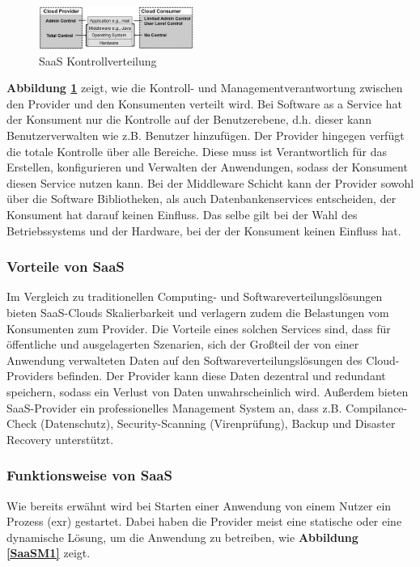 \begin{figure}[H]
    \centering
	\includegraphics[width=0.45\textwidth]{Images/SaaSControl}
	\caption{SaaS Kontrollverteilung \cite{Badger}}
	\label{SaaSControl}
\end{figure}

\textbf{Abbildung \ref{SaaSControl}} zeigt, wie die Kontroll- und Managementverantwortung zwischen den Provider und den Konsumenten verteilt wird.
Bei Software as a Service hat der Konsument nur die Kontrolle auf der Benutzerebene, d.h. dieser kann Benutzerverwalten wie z.B. Benutzer hinzufügen.
Der Provider hingegen verfügt die totale Kontrolle über alle Bereiche. Diese muss ist Verantwortlich für das Erstellen, konfigurieren und Verwalten der Anwendungen, 
sodass der Konsument diesen Service nutzen kann.
Bei der Middleware Schicht kann der Provider sowohl über die Software Bibliotheken, als auch Datenbankenservices entscheiden, der Konsument hat darauf keinen Einfluss.
Das selbe gilt bei der Wahl des Betriebssystems und der Hardware, bei der der Konsument keinen Einfluss hat.

\subsubsection*{Vorteile von SaaS}

Im Vergleich zu traditionellen Computing- und Softwareverteilungslösungen bieten SaaS-Clouds Skalierbarkeit und verlagern zudem die Belastungen vom Konsumenten zum Provider.
Die Vorteile eines solchen Services sind, dass für öffentliche und ausgelagerten Szenarien, sich der Großteil der von einer Anwendung verwalteten Daten auf den Softwareverteilungslösungen
des Cloud-Providers befinden. Der Provider kann diese Daten dezentral und redundant speichern, sodass ein Verlust von Daten unwahrscheinlich wird. Außerdem bieten SaaS-Provider
ein professionelles Management System an, dass z.B. Compilance-Check (Datenschutz), Security-Scanning (Virenprüfung), Backup und Disaster Recovery unterstützt.


\subsubsection{Funktionsweise von SaaS}

Wie bereits erwähnt wird bei Starten einer Anwendung von einem Nutzer ein Prozess (exr) gestartet. Dabei haben die Provider meist eine statische oder eine dynamische
Lösung, um die Anwendung zu betreiben, wie \textbf{Abbildung \ref{SaaSM1}} zeigt.

